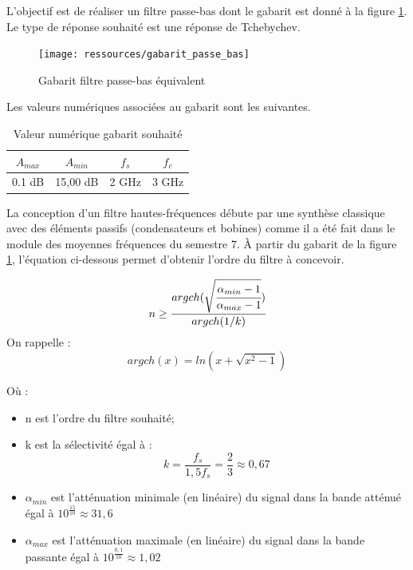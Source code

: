 \documentclass[french]{article}
\begin{document}
L'objectif est de réaliser un filtre passe-bas dont le gabarit est donné à la figure \ref{fig:gabarit_PasseBas}. Le type de réponse souhaité est une réponse de Tchebychev.

\begin{figure}[H]
	\centering
	\texttt{[image: ressources/gabarit\_passe\_bas]}
	\caption{Gabarit filtre passe-bas équivalent}
	\label{fig:gabarit_PasseBas}
\end{figure}

Les valeurs numériques associées au gabarit sont les suivantes.
\begin{table}[H]
	\centering
	\begin{tabular}{|c|c|c|c|}
		\hline
		$A_{max}$& $A_{min}$ & $f_s$ & $f_c$ \\ \hline
		0.1	dB & 15,00 dB 		& 2 GHz	   & 3 GHz \\ \hline
	\end{tabular}
	\caption{Valeur numérique gabarit souhaité}
\end{table}
La conception d'un filtre hautes-fréquences débute par une synthèse classique avec des éléments passifs (condensateurs et bobines) comme il a été fait dans le module des moyennes fréquences du semestre 7. À partir du gabarit de la figure \ref{fig:gabarit_PasseBas}, l'équation ci-dessous permet d'obtenir l'ordre du filtre à concevoir.


\begin{equation}
	n \geq \cfrac{argch(\sqrt{\cfrac{\alpha_{min}-1}{\alpha_{max} -1}})}{argch(1/k)}
\end{equation}
On rappelle :
\begin{equation}
argch(x)=ln(x+\sqrt{x^2-1})
\end{equation}

Où :
\begin{itemize}
	\item n est l'ordre du filtre souhaité;
		\item k est la sélectivité égal à : 
	\begin{equation}
	k=\frac{f_s}{1,5f_s} = \frac{2}{3} \approx 0,67
	\end{equation}
	\item $\alpha_{min}$ est l'atténuation minimale (en linéaire) du signal dans la bande atténué égal à $10^{\frac{15}{10}} \approx 31,6$
	\item $\alpha_{max}$ est l'atténuation maximale (en linéaire) du signal dans la bande passante égal à $10^{\frac{0,1}{10}} \approx 1,02$
\end{itemize}
\end{document}
